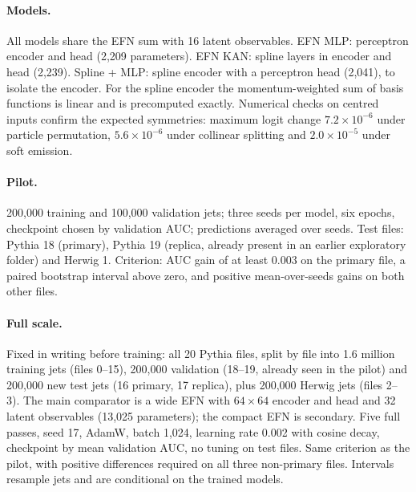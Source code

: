 \documentclass[11pt]{article}
\begin{document}
\paragraph{Models.} All models share the EFN sum with 16 latent observables. EFN MLP: perceptron encoder and head
(2,209 parameters). EFN KAN: spline layers in encoder and head (2,239). Spline + MLP: spline encoder with a perceptron
head (2,041), to isolate the encoder. For the spline encoder the momentum-weighted sum of basis functions is linear
and is precomputed exactly. Numerical checks on centred inputs confirm the expected symmetries: maximum logit change
$7.2\times10^{-6}$ under particle permutation, $5.6\times10^{-6}$ under collinear splitting and $2.0\times10^{-5}$ under
soft emission.
\paragraph{Pilot.} 200,000 training and 100,000 validation jets; three seeds per model, six epochs, checkpoint chosen
by validation AUC; predictions averaged over seeds. Test files: Pythia 18 (primary), Pythia 19 (replica, already
present in an earlier exploratory folder) and Herwig 1. Criterion: AUC gain of at least 0.003 on the primary file, a
paired bootstrap interval above zero, and positive mean-over-seeds gains on both other files.
\paragraph{Full scale.} Fixed in writing before training: all 20 Pythia files, split by file into 1.6 million training
jets (files 0--15), 200,000 validation (18--19, already seen in the pilot) and 200,000 new test jets (16 primary, 17
replica), plus 200,000 Herwig jets (files 2--3). The main comparator is a wide EFN with $64\times64$ encoder and head
and 32 latent observables (13,025 parameters); the compact EFN is secondary. Five full passes, seed 17, AdamW,
batch 1,024, learning rate 0.002 with cosine decay, checkpoint by mean validation AUC, no tuning on test files. Same
criterion as the pilot, with positive differences required on all three non-primary files. Intervals resample jets and
are conditional on the trained models.
\end{document}
